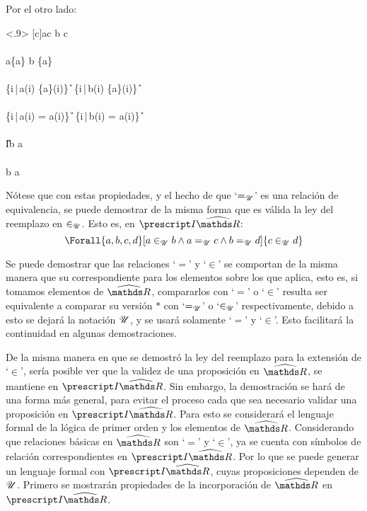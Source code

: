 \begin{demo}
  Por el otro lado:
  \begin{longderivation}<.9>
      { [c\in\IRh]{a\inu c \equiv b \inu c} }\\
    \To\\
      { a\inu \{a\} \equiv b \inu \{a\} }\\
    \equiv\\
      {
        \{i\,|\,a(i) \in \{a\}(i)\} \in\U
        \equiv
        \{i\,|\,b(i) \in \{a\}(i)\} \in\U
      }\\
    \equiv\\
      {
        \{i\,|\,a(i) = a(i)\} \in\U
        \equiv
        \{i\,|\,b(i) = a(i)\} \in\U
      }\\
    \equiv\\
      { I\in\U \equiv b \equ a }\\
    \equiv\\
      { b \equ a }
  \end{longderivation}
\end{demo}

Nótese que con estas propiedades, y el hecho de que `$=_{\mathscr{U}}$' es una
relación de equivalencia, se puede demostrar de la misma forma que
es válida la ley del reemplazo en $\in_{\mathscr{U}}$. Esto es, en $\IRh$:
\[\Forall{a,b,c,d}[a\inu b \land a\equ c \land b \equ d]{c\inu d}\]

Se puede demostrar que las relaciones `$=$' y `$\in$' se comportan de
la misma manera que su correspondiente para los elementos sobre los que
aplica, esto es, si tomamos elementos de $\Rh$, compararlos con `$=$' o
`$\in$' resulta ser equivalente a comparar su versión $*$ con `$=_{\mathscr{U}}$'
o `$\in_{\mathscr{U}}$' respectivamente, debido a esto se dejará la notación $\mathscr{U}$, y
se usará solamente `$=$' y `$\in$'. Esto facilitará la
continuidad en algunas demostraciones.

De la misma manera en que se demostró la ley del reemplazo para
la extensión de `$\in$', sería posible ver que la validez de una
proposición en $\Rh$, se mantiene en $\IRh$. Sin embargo, la
demostración se hará de una forma más general, para evitar el proceso
cada que sea necesario validar una proposición en $\IRh$. Para esto se
considerará el lenguaje formal de la lógica de primer orden y los
elementos de $\Rh$. Considerando que relaciones
básicas en $\Rh$ son `$=$' y `$\in$', ya se cuenta con símbolos de
relación correspondientes en $\IRh$. Por lo que se puede generar un
lenguaje formal con $\IRh$, cuyas proposiciones dependen de $\mathscr{U}$.
Primero se mostrarán propiedades de la incorporación de $\Rh$ en $\IRh$.

